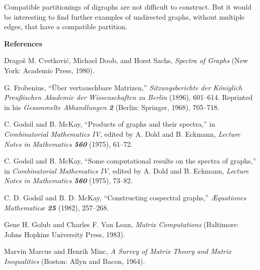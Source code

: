 Compatible partitionings of digraphs are not difficult to construct. But it
would be interesting to find further examples of undirected graphs, without
multiple edges, that have a compatible partition.

\bigskip
\centerline{\bf References}

\bigskip
\bib
[\Cvet]
Drago{\v s} M. Cvetkovi\'c, Michael Doob, and Horst Sachs, {\sl Spectra of
Graphs\/} (New York: Academic Press, 1980).

\bib
[\Frob]
G. Frobenius, ``\"Uber vertauschbare Matrizen,'' {\sl Sitzungsberichte der
K\"oniglich Preu{\ss}ischen Akademie der Wissenschaften zu Berlin\/} (1896),
601--614. Reprinted in his {\sl Gesammelte Abhandlungen\/ \bf 2} (Berlin:
Springer, 1968), 705--718.

\bib
[\GMi]
C. Godsil and B. McKay, ``Products of graphs and their spectra,'' in
{\sl Combinatorial Mathematics IV}, edited by A. Dold and B. Eckmann,
{\sl Lecture Notes in Mathematics\/ \bf560} (1975), 61--72.

\bib
[\GMii]
C. Godsil and B. McKay, ``Some computational results on the spectra of 
graphs,'' in
{\sl Combinatorial Mathematics IV}, edited by A. Dold and B. Eckmann,
{\sl Lecture Notes in Mathematics\/ \bf560} (1975), 73--82.

\bib
[\GMiii]
C. D.  Godsil and B. D. McKay, ``Constructing cospectral graphs,''
{\sl {\AE}quationes Mathematic{\ae}\/ \bf 25} (1982), 257--268.

\bib
[\GVL]
Gene H. Golub and Charles F. Van Loan, {\sl Matrix Computations\/}
(Baltimore: Johns Hopkins University Press, 1983).

\bib
[\MaMi]
Marvin Marcus and Henrik Minc, {\sl A Survey of Matrix Theory and Matrix
Inequalities\/} (Boston: Allyn and Bacon, 1964).

\bye
